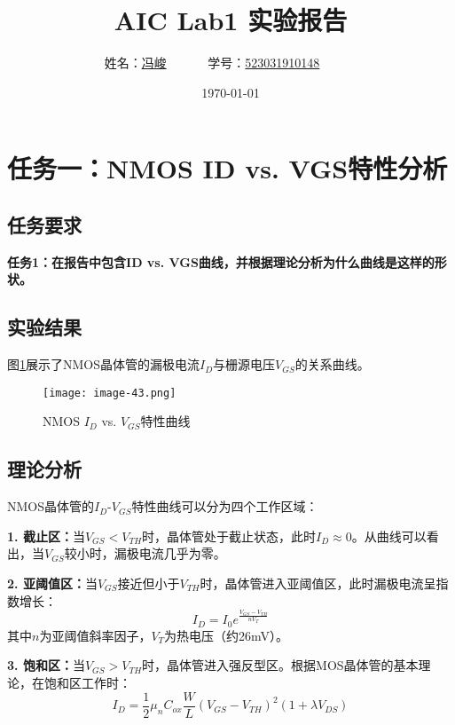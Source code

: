 \documentclass[UTF8,12pt,a4paper]{ctexart}
\title{AIC Lab1 实验报告}
\author{
	姓名：\underline{冯峻}~~~~~~
	学号：\underline{523031910148}~~~~~~}
\date{\today}
\begin{document}
\fancyfoot[C]{\thepage}

\maketitle
\tableofcontents
\newpage




\section{任务一：NMOS ID vs. VGS特性分析}

\subsection{任务要求}
\textbf{任务1：在报告中包含ID vs. VGS曲线，并根据理论分析为什么曲线是这样的形状。}

\subsection{实验结果}
图\ref{fig:task1}展示了NMOS晶体管的漏极电流$I_D$与栅源电压$V_{GS}$的关系曲线。

\begin{figure}[h]
\centering
\texttt{[image: image-43.png]}
\caption{NMOS $I_D$ vs. $V_{GS}$特性曲线}
\label{fig:task1}
\end{figure}

\subsection{理论分析}
NMOS晶体管的$I_D$-$V_{GS}$特性曲线可以分为四个工作区域：

\textbf{1. 截止区：}当$V_{GS} < V_{TH}$时，晶体管处于截止状态，此时$I_D \approx 0$。从曲线可以看出，当$V_{GS}$较小时，漏极电流几乎为零。

\textbf{2. 亚阈值区：}当$V_{GS}$接近但小于$V_{TH}$时，晶体管进入亚阈值区，此时漏极电流呈指数增长：
\begin{equation}
I_D = I_0 e^{\frac{V_{GS}-V_{TH}}{nV_T}}
\end{equation}
其中$n$为亚阈值斜率因子，$V_T$为热电压（约26mV）。

\textbf{3. 饱和区：}当$V_{GS} > V_{TH}$时，晶体管进入强反型区。根据MOS晶体管的基本理论，在饱和区工作时：
\begin{equation}
I_D = \frac{1}{2}\mu_n C_{ox}\frac{W}{L}(V_{GS}-V_{TH})^2(1+\lambda V_{DS})
\end{equation}
\end{document}
